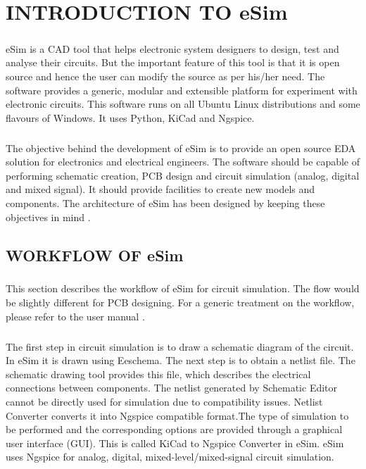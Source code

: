 \chapter{INTRODUCTION TO eSim}

\paragraph{}eSim is a CAD tool that helps electronic system designers to design, test and analyse
their circuits. But the important feature of this tool is that it is open source and hence
the user can modify the source as per his/her need. The software provides a generic,
modular and extensible platform for experiment with electronic circuits. This software
runs on all Ubuntu Linux distributions and some flavours of Windows. It uses Python,
KiCad and Ngspice.

\paragraph{}

The objective behind the development of eSim is to provide an open source EDA
solution for electronics and electrical engineers. The software should be capable of
performing schematic creation, PCB design and circuit simulation (analog, digital and
mixed signal). It should provide facilities to create new models and components. The
architecture of eSim has been designed by keeping these objectives in mind \cite{esimusermanual} .

\section*{WORKFLOW OF eSim}
\paragraph{}

This section describes the workflow of eSim for circuit simulation. The flow would be slightly different for PCB designing. For a generic treatment on the workflow, please refer to the user manual .

\paragraph{}

The first step in circuit simulation is to draw a schematic diagram of the circuit. In eSim it is drawn using Eeschema. The next step is to obtain a netlist file. The schematic drawing tool provides this file, which describes the electrical connections between components.
The netlist generated by Schematic Editor cannot be directly used for simulation due to compatibility issues. Netlist Converter converts it into Ngspice compatible format.The type of simulation to be performed and the corresponding options are provided through a graphical user interface (GUI). This is called KiCad to Ngspice Converter in eSim. 
eSim uses Ngspice for analog, digital, mixed-level/mixed-signal circuit simulation.


